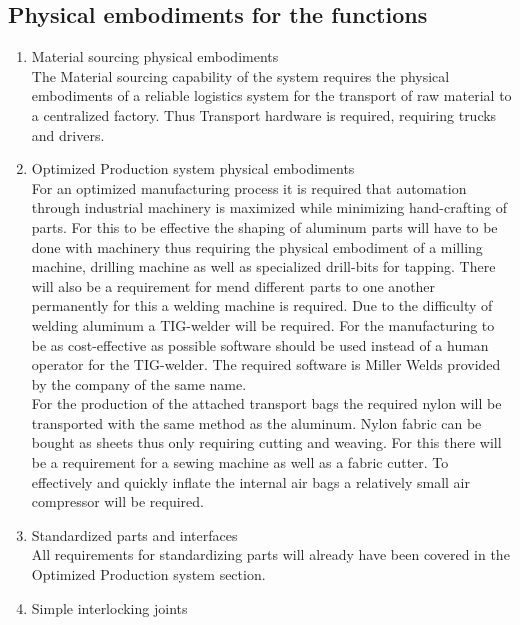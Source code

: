     \subsection{Physical embodiments for the functions}
      \begin{enumerate} 
        \item Material sourcing physical embodiments \\
          The Material sourcing capability of the system requires the physical
          embodiments of a reliable logistics system for the transport
          of raw material to a centralized factory. Thus Transport hardware is
          required, requiring trucks and drivers. \\
        \item Optimized Production system physical embodiments \\
          For an optimized manufacturing process it is required that automation
          through industrial machinery is maximized while minimizing
          hand-crafting of parts. For this to be effective the shaping of
          aluminum parts will have to be done with machinery thus requiring the
          physical embodiment of a milling machine, drilling machine as well as
          specialized drill-bits for tapping. There will also be a requirement
          for mend different parts to one another permanently for this a welding
          machine is required. Due to the difficulty of welding aluminum a
          TIG-welder will be required. For the manufacturing to be as
          cost-effective as possible software should be used instead of a human
          operator for the TIG-welder. The required software is Miller Welds
          provided by the company of the same name. \\ For the production of the
          attached transport bags the required nylon will be transported with
          the same method as the aluminum. Nylon fabric can be bought as
          sheets thus only requiring cutting and weaving. For this there will be
          a requirement for a sewing machine as well as a fabric cutter. To
          effectively and quickly inflate the internal air bags a relatively
          small air compressor will be required. 
        \item Standardized parts and interfaces \\
          All requirements for standardizing parts will already have been
          covered in the Optimized Production system section.
        \item Simple interlocking joints \\

\end{enumerate}
